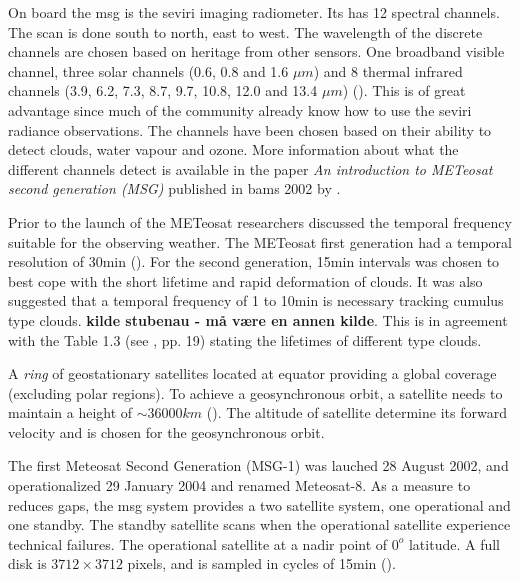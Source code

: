 On board the \acrshort{msg} is the \acrfull{seviri} imaging radiometer. Its has  12 spectral channels. The scan is done south to north, east to west. The wavelength of the discrete channels are chosen based on heritage from other sensors. One broadband visible channel, three solar channels (0.6, 0.8 and 1.6 $\mu m$) and 8 thermal infrared channels (3.9, 6.2, 7.3, 8.7, 9.7, 10.8, 12.0 and 13.4 $\mu m$) (\cite{Taravat2015MultilayerMasking}). This is of great advantage since much of the community already know how to use the \acrshort{seviri} radiance observations. The channels have been chosen based on their ability to detect clouds, water vapour and ozone. More information about what the different channels detect is available in the paper \textit{An introduction to METeosat second generation (MSG)} published in \acrshort{bams} 2002 by \citeauthor{Schmetz_meteosat_intro}.

Prior to the launch of the METeosat researchers discussed the temporal frequency suitable for the observing weather. The METeosat first generation had a temporal resolution of 30min (\cite{Stockli2019CloudApplications}). For the second generation, 15min intervals was chosen to best cope with the short lifetime and rapid deformation of clouds. It was also suggested that a temporal frequency of 1 to 10min is necessary tracking cumulus type clouds. \textbf{kilde stubenau - må være en annen kilde}. This is in agreement with the Table 1.3 (see \cite{lohmann2016}, pp. 19) stating the lifetimes of different type clouds.

A \textit{ring} of geostationary satellites located at equator providing a global coverage (excluding polar regions). To achieve a geosynchronous orbit, a satellite needs to maintain a height of $\sim 36 000km$ (\cite{Bley2013ASEVIRI}). The altitude of satellite determine its forward velocity and is chosen for the geosynchronous orbit. 

The first Meteosat Second Generation (MSG-1) was lauched 28 August 2002, and operationalized 29 January 2004 and renamed Meteosat-8. As a measure to reduces gaps, the \acrshort{msg} system provides a two satellite system, one operational and one standby. The standby satellite scans when the operational satellite experience technical failures. 
The operational satellite at a nadir point of $0^o$ latitude. A full disk is $3712\times 3712$ pixels, and is sampled in cycles of 15min (\cite{Schmetz_meteosat_intro}).

